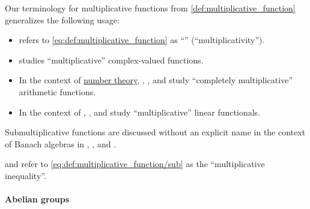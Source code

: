 \begin{remark}\label{rem:multiplicative_function_terminology}
  Our terminology for multiplicative functions from \cref{def:multiplicative_function} generalizes the following usage:
  \begin{itemize}
    \item \Textcite[342]{ЛюстерникСоболев1965ФункциональныйАнализ} refers to \eqref{eq:def:multiplicative_function} as \enquote{} (\enquote{multiplicativity}).

    \item \Textcite[141]{Jacobson1985BasicAlgebraI} studies \enquote{multiplicative} complex-valued functions.

    \item In the context of \hyperref[con:arithmetic/algebraic]{number theory}, \textcite[33]{Apostol1976AnalyticNumberTheory},
    \textcite[exerc. 1.2.4.29]{Knuth1997ArtVol1}, \textcite[def. 37]{Бухштаб1966ТеорияЧисел} and \textcite[exerc. 4.28]{ГашковЧубариков2005СложностьВычисления} study \enquote{completely multiplicative} arithmetic functions.

    \item In the context of , \textcite[240]{Engelking1989GeneralTopology},
    \textcite[def. 4.14.1]{HillePhillips1996FunctionalAnalysis} and \textcite[364]{Rudin1987RealAndComplexAnalysis} study \enquote{multiplicative} linear functionals.
  \end{itemize}

  Submultiplicative functions are discussed without an explicit name in the context of Banach algebras in
  \cite[243]{Kelley1975GeneralTopology},
  \cite[def. 1.15.1]{HillePhillips1996FunctionalAnalysis},
  \cite[154]{Folland1999RealAnalysis} and
  \cite[188]{Carothers2000RealAnalysis}.

  \textcite[def. 18.1]{Rudin1987RealAndComplexAnalysis} and \textcite[prop. 4]{Хелемский2014ФункциональныйАнализ} refer to \eqref{eq:def:multiplicative_function/sub} as the \enquote{multiplicative inequality}.
\end{remark}

\paragraph{Abelian groups}

